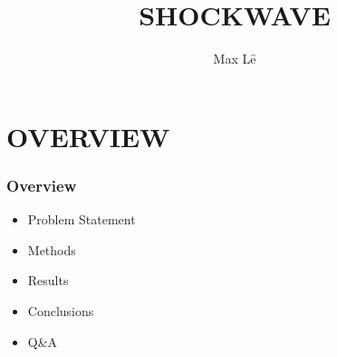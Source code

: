 \documentclass{beamer}
\title{SHOCKWAVE}
\author{Max L$\hat{\textrm{e}}$}
\begin{document}
    {
    \begin{frame}
        \maketitle
    \end{frame}
    }

    \section{OVERVIEW}    
    \begin{frame}
        \frametitle{Overview}
        \begin{itemize}
            \item Problem Statement 
            \item Methods 
            \item Results
            \item Conclusions
            \item Q\&A            
        \end{itemize}
    \end{frame}
    
\end{document}
